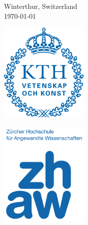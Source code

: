 \begin{titlepage}
%
\large Winterthur, Switzerland\\
{\large \today}\\[2cm] %

\begin{center}
\begin{minipage}{0.4\textwidth}
\includegraphics[width=4.3cm]{Figures/_Frontpage/Kth_logo.png}  
\end{minipage} 
\begin{minipage}{0.2\textwidth}
\includegraphics[width=4.3cm]{Figures/_Frontpage/ZHAW_Logo.png}  
\end{minipage}
\end{center}

\restoregeometry
\end{titlepage}


